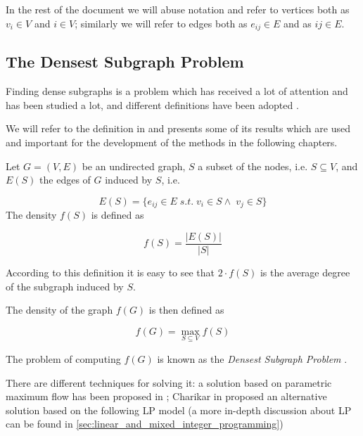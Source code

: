 \bigskip

In the rest of the document we will abuse notation and refer to vertices both
as $v_{i} \in V $ and $i \in V$; similarly we will refer to edges both as
$e_{ij} \in E $ and as $ij \in E$.

\subsection{The Densest Subgraph Problem}%
\label{sub:densest_subgraphs}

Finding dense subgraphs is a problem which has received a lot of attention and
has been studied a lot, and different definitions have been adopted
\cite{charikar2000greedy}\cite{asahiro1995finding}\cite{asahiro2000greedily}
\cite{feige1997densest}.

We will refer to the definition in \cite{charikar2000greedy} and presents some
of its results which are used and important for the development of the methods
in the following chapters.

\medskip

Let $G = (V, E)$ be an undirected graph, $S$ a subset of the nodes, i.e. $S
	\subseteq V$, and $E(S)$ the edges of $G$ induced by $S$, i.e.

\begin{equation*}
	E(S) = \{e_{ij} \in E \; s.t. \; v_i \in S \land \; v_j \in S\}
\end{equation*}
The density $f(S)$ is defined as

\begin{equation}
	f(S) = \frac{|E(S)|}{|S|}
\end{equation}

According to this definition it is easy to see that $2 \cdot f(S)$ is the
average degree of the subgraph induced by $S$.

The density of the graph $f(G)$ is then defined as

\begin{equation}
	f(G) = \max_{S \subseteq V} {f(S)}
\end{equation}

The problem of computing $f(G)$ is known as the \emph{Densest Subgraph Problem}
\cite{charikar2000greedy}.

There are different techniques for solving it: a solution based on parametric
maximum flow has been proposed in \cite{Gallo1989}; Charikar in
\cite{charikar2000greedy} proposed an alternative solution based on the
following \acrlong{LP} model (a more in-depth discussion about \acrshort{LP}
can be found in \autoref{sec:linear_and_mixed_integer_programming})

